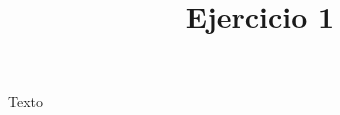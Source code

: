 \documentclass[leqno, 12pt, twoside, letterpaper]{book}
\date{\vspace{-5ex}}
\title{Ejercicio 1}
\begin{document}
\maketitle
Texto
\end{document}
